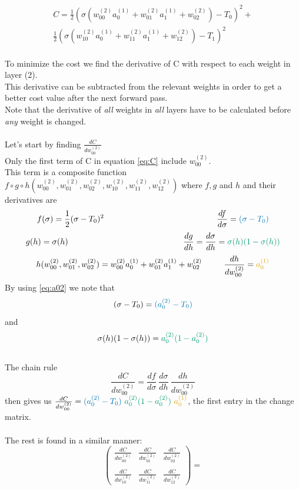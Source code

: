 \documentclass{article}
\begin{document}
\begin{equation} \label{eq:C}
\begin{aligned}
C = \frac {1}{2}(\sigma(w_{00}^{(2)}a_0^{(1)}+w_{01}^{(2)}a_1^{(1)}+w_{02}^{(2)})-T_0)^2 +
\\
\frac {1}{2}(\sigma(w_{10}^{(2)}a_0^{(1)}+w_{11}^{(2)}a_1^{(1)}+w_{12}^{(2)})-T_1)^2
\end{aligned}
\end{equation}
\\
To minimize the cost we find the derivative of C with respect to each weight in layer (2).
\\
This derivative can be subtracted from the relevant weights in order to get a better cost value after the next forward pass.
\\
Note that the derivative of \textit{all} weights in \textit{all} layers have to be calculated before \textit{any} weight is changed.
\\
\\
Let's start by finding $\frac{dC}{dw_{00}^{(2)}}$
\\
Only the first term of C in equation \eqref{eq:C} include $w_{00}^{(2)}$.
\\
This term is a composite function $f \circ g \circ h(w_{00}^{(2)}, w_{01}^{(2)}, w_{02}^{(2)}, w_{10}^{(2)}, w_{11}^{(2)},w_{12}^{(2)})$ where $f, g$ and $h$ and their derivatives are
$$f(\sigma) = \frac {1}{2}(\sigma-T_0)^2~~~~~~~~~~~~~~~~~~~~~~~~~~~~~~~~~~~~~~~~~\frac{df}{d\sigma} = \textcolor{darkblue}{(\sigma-T_0)}$$
$$g(h) = \sigma(h)~~~~~~~~~~~~~~~~~~~~~~~~~~~~~~~~~~~~~~~~~~\frac{dg}{dh} = \frac{d\sigma}{dh} = \textcolor{green}{\sigma(h)(1 - \sigma(h))}$$
$$h(w_{00}^{(2)}, w_{01}^{(2)}, w_{02}^{(2)}) = w_{00}^{(2)}a_0^{(1)}+w_{01}^{(2)}a_1^{(1)}+w_{02}^{(2)}~~~~~~~~\frac{dh}{dw_{00}^{(2)}} = \textcolor{orange}{a_0^{(1)}}$$
By using  \eqref{eq:a02} we note that $$(\sigma - T_0) = \textcolor{darkblue}{(a_0^{(2)} - T_0)}$$ and $$\sigma(h)(1-\sigma(h)) = \textcolor{green}{a_0^{(2)}(1-a_0^{(2)})}$$
\\ The chain rule $$\frac{dC}{dw_{00}^{(2)}} = \frac{df}{d\sigma}~\frac{d\sigma}{dh}~\frac{dh}{dw_{00}^{(2)}}$$
then gives us
$\frac{dC}{dw_{00}^{(2)}} = \textcolor{darkblue}{(a_0^{(2)}-T_0)}~\textcolor{green}{a_0^{(2)}(1-a_0^{(2)})}~\textcolor{orange}{a_0^{(1)}} $, the first entry in the change matrix.
\\
\\
The rest is found in a similar manner:
$$\begin{pmatrix}
\frac{dC}{dw_{00}^{(2)}} & \frac{dC}{dw_{01}^{(2)}} & \frac{dC}{dw_{02}^{(2)}}
\\\\
\frac{dC}{dw_{10}^{(2)}} & \frac{dC}{dw_{11}^{(2)}} & \frac{dC}{dw_{12}^{(2)}}
\end{pmatrix} =
$$
\end{document}
